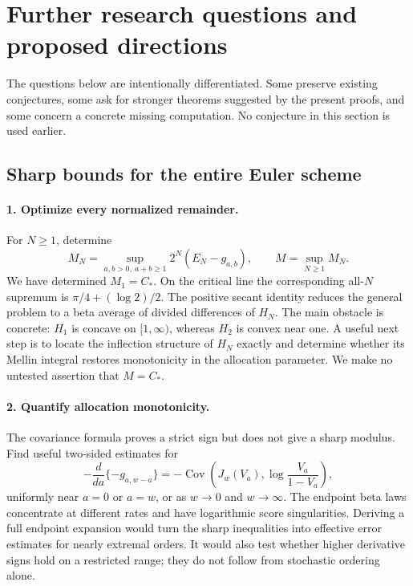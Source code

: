 \documentclass[11pt,a4paper]{article}
\numberwithin{equation}{section}
\theoremstyle{definition}
\theoremstyle{remark}
\begin{document}
\section{Further research questions and proposed directions}
\label{sec:research}

The questions below are intentionally differentiated. Some preserve
existing conjectures, some ask for stronger theorems suggested by the
present proofs, and some concern a concrete missing computation.
No conjecture in this section is used earlier.

\subsection{Sharp bounds for the entire Euler scheme}

\paragraph{1. Optimize every normalized remainder.}
For $N\ge1$, determine
\[
 M_N=\sup_{a,b>0,\ a+b\ge1}2^N(E_N-g_{a,b}),
 \qquad M=\sup_{N\ge1}M_N.
\]
We have determined $M_1=C_*$. On the critical line the corresponding
all-$N$ supremum is $\pi/4+(\log2)/2$. The positive secant identity
reduces the general problem to a beta average of divided differences
of $H_N$. The main obstacle is concrete: $H_1$ is concave on
$[1,\infty)$, whereas $H_2$ is convex near one. A useful next step is
to locate the inflection structure of $H_N$ exactly and determine
whether its Mellin integral restores monotonicity in the allocation
parameter. We make no untested assertion that $M=C_*$.

\paragraph{2. Quantify allocation monotonicity.}
The covariance formula proves a strict sign but does not give a sharp
modulus. Find useful two-sided estimates for
\[
 -\frac{d}{da}\{-g_{a,w-a}\}
 =-\operatorname{Cov}\!\left(J_w(V_a),
                          \log\frac{V_a}{1-V_a}\right),
\]
uniformly near $a=0$ or $a=w$, or as $w\to0$ and $w\to\infty$.
The endpoint beta laws concentrate at different rates and have
logarithmic score singularities. Deriving a full endpoint expansion
would turn the sharp inequalities into effective error estimates for
nearly extremal orders. It would also test whether higher derivative
signs hold on a restricted range; they do not follow from stochastic
ordering alone.
\end{document}
